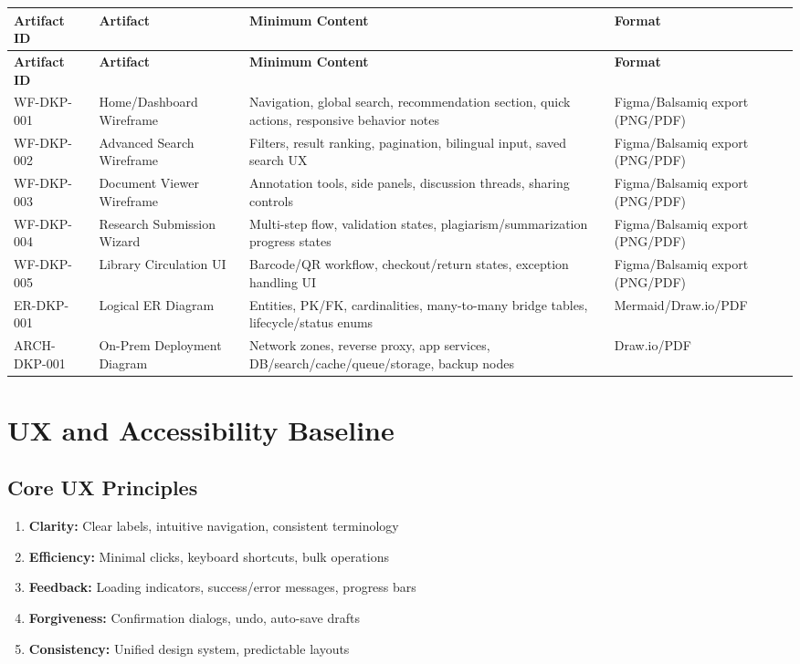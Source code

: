 \documentclass[12pt,a4paper]{report}
\begin{document}
\begin{longtable}{|p{2.8cm}|p{4.8cm}|p{4.4cm}|p{3cm}|}
\hline
\textbf{Artifact ID} & \textbf{Artifact} & \textbf{Minimum Content} & \textbf{Format} \\ \hline
\endfirsthead
\hline
\textbf{Artifact ID} & \textbf{Artifact} & \textbf{Minimum Content} & \textbf{Format} \\ \hline
\endhead
WF-DKP-001 & Home/Dashboard Wireframe & Navigation, global search, recommendation section, quick actions, responsive behavior notes & Figma/Balsamiq export (PNG/PDF) \\ \hline
WF-DKP-002 & Advanced Search Wireframe & Filters, result ranking, pagination, bilingual input, saved search UX & Figma/Balsamiq export (PNG/PDF) \\ \hline
WF-DKP-003 & Document Viewer Wireframe & Annotation tools, side panels, discussion threads, sharing controls & Figma/Balsamiq export (PNG/PDF) \\ \hline
WF-DKP-004 & Research Submission Wizard & Multi-step flow, validation states, plagiarism/summarization progress states & Figma/Balsamiq export (PNG/PDF) \\ \hline
WF-DKP-005 & Library Circulation UI & Barcode/QR workflow, checkout/return states, exception handling UI & Figma/Balsamiq export (PNG/PDF) \\ \hline
ER-DKP-001 & Logical ER Diagram & Entities, PK/FK, cardinalities, many-to-many bridge tables, lifecycle/status enums & Mermaid/Draw.io/PDF \\ \hline
ARCH-DKP-001 & On-Prem Deployment Diagram & Network zones, reverse proxy, app services, DB/search/cache/queue/storage, backup nodes & Draw.io/PDF \\ \hline
\end{longtable}

\section{UX and Accessibility Baseline}

\subsection{Core UX Principles}
\begin{enumerate}
    \item \textbf{Clarity:} Clear labels, intuitive navigation, consistent terminology
    \item \textbf{Efficiency:} Minimal clicks, keyboard shortcuts, bulk operations
    \item \textbf{Feedback:} Loading indicators, success/error messages, progress bars
    \item \textbf{Forgiveness:} Confirmation dialogs, undo, auto-save drafts
    \item \textbf{Consistency:} Unified design system, predictable layouts
\end{enumerate}
\end{document}
